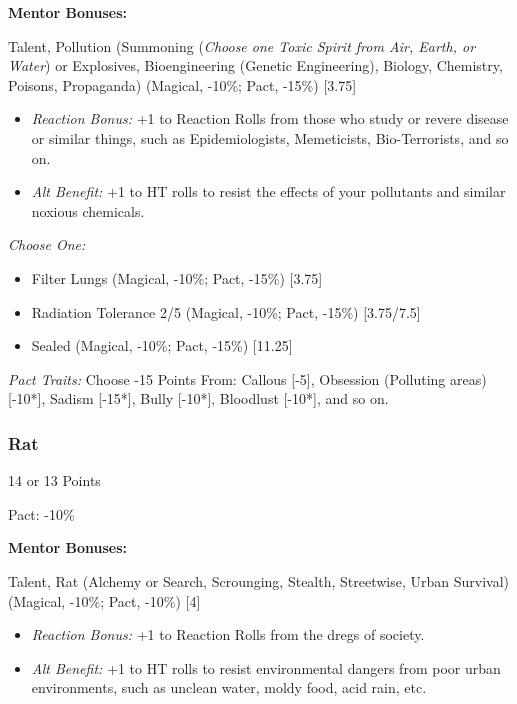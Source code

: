 \begin{multicols}{3}
	\textbf{Mentor Bonuses:} 
	
	Talent, Pollution (Summoning (\textit{Choose one Toxic Spirit from Air, Earth, or Water}) or Explosives, Bioengineering (Genetic Engineering), Biology, Chemistry, Poisons, Propaganda) (Magical, -10\%; Pact, -15\%) [3.75]
	\begin{itemize}
		\itemsep 0pt
		\item \textit{Reaction Bonus:} +1 to Reaction Rolls from those who study or revere disease or similar things, such as Epidemiologists, Memeticists, Bio-Terrorists, and so on.
		\item \textit{Alt Benefit:} +1 to HT rolls to resist the effects of your pollutants and similar noxious chemicals.
	\end{itemize}
	
	\textit{Choose One:}
	\begin{itemize}
		\itemsep 0pt
		\item Filter Lungs (Magical, -10\%; Pact, -15\%) [3.75]
		\item Radiation Tolerance 2/5 (Magical, -10\%; Pact, -15\%) [3.75/7.5]
		\item Sealed (Magical, -10\%; Pact, -15\%) [11.25]
	\end{itemize}
	
	\textit{Pact Traits:} Choose -15 Points From: Callous [-5], Obsession (Polluting areas) [-10*], Sadism [-15*], Bully [-10*], Bloodlust [-10*], and so on.
	
	\subsubsection{Rat}
	\begin{flushright}
		14 or 13 Points
	\end{flushright}
	Pact: -10\%
	
	
	\textbf{Mentor Bonuses:} 
	
	Talent, Rat (Alchemy or Search, Scrounging, Stealth, Streetwise, Urban Survival) (Magical, -10\%; Pact, -10\%) [4]
	\begin{itemize}
		\itemsep 0pt
		\item \textit{Reaction Bonus:} +1 to Reaction Rolls from the dregs of society.
		\item \textit{Alt Benefit:} +1 to HT rolls to resist environmental dangers from poor urban environments, such as unclean water, moldy food, acid rain, etc.
	\end{itemize}
	

\end{multicols}
